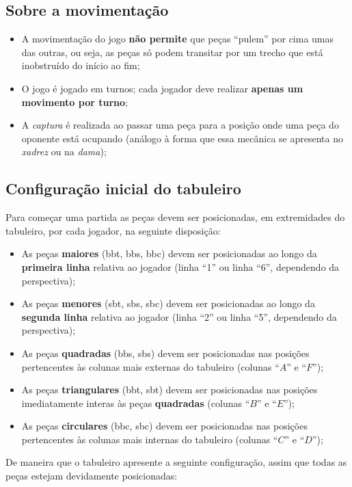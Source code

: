 \subsection{Sobre a movimentação}
\begin{itemize}
  \item A movimentação do jogo \textbf{não permite} que peças ``pulem'' por cima umas das outras, ou seja, as peças só
    podem transitar por um trecho que está inobstruído do início ao fim;
  \item O jogo é jogado em turnos; cada jogador deve realizar \textbf{apenas um movimento por turno};
  \item A \textit{captura} é realizada ao passar uma peça para a posição onde uma peça do oponente está ocupando
    (análogo à forma que essa mecânica se apresenta no \textit{xadrez} ou na \textit{dama});
\end{itemize}

\subsection{Configuração inicial do tabuleiro}
Para começar uma partida as peças devem ser posicionadas, em extremidades do tabuleiro, por cada jogador, na seguinte
disposição:

\begin{itemize}
  \item As peças \textbf{maiores} (\gls{bbt}, \gls{bbs}, \gls{bbc}) devem ser posicionadas ao longo da \textbf{primeira linha} relativa
    ao jogador (linha ``1'' ou linha ``6'', dependendo da perspectiva);
  \item As peças \textbf{menores} (\gls{sbt}, \gls{sbs}, \gls{sbc}) devem ser posicionadas ao longo da \textbf{segunda linha} relativa
    ao jogador (linha ``2'' ou linha ``5'', dependendo da perspectiva);
  \item As peças \textbf{quadradas} (\gls{bbs}, \gls{sbs}) devem ser posicionadas nas posições pertencentes às colunas mais
    externas do tabuleiro (colunas ``$A$'' e ``$F$'');
  \item As peças \textbf{triangulares} (\gls{bbt}, \gls{sbt}) devem ser posicionadas nas posições imediatamente interas às peças
    \textbf{quadradas} (colunas ``$B$'' e ``$E$'');
  \item As peças \textbf{circulares} (\gls{bbc}, \gls{sbc}) devem ser posicionadas nas posições pertencentes às colunas mais
    internas do tabuleiro (colunas ``$C$'' e ``$D$'');
\end{itemize}
De maneira que o tabuleiro apresente a seguinte configuração, assim que todas as peças estejam devidamente posicionadas:

